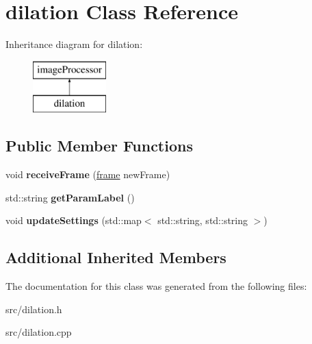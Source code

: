 \hypertarget{classdilation}{}\section{dilation Class Reference}
\label{classdilation}
Inheritance diagram for dilation\+:\begin{figure}[H]
\begin{center}
\leavevmode
\includegraphics[height=2.000000cm]{classdilation}
\end{center}
\end{figure}
\subsection*{Public Member Functions}
\begin{DoxyCompactItemize}
\item 
void {\bfseries receive\+Frame} (\hyperlink{classframe}{frame} new\+Frame)\hypertarget{classdilation_ad2edf7b45ead513737cce8ba2190ea38}{}\label{classdilation_ad2edf7b45ead513737cce8ba2190ea38}

\item 
std\+::string {\bfseries get\+Param\+Label} ()\hypertarget{classdilation_aac678c6a5fd8a4bcd6e5fd82a4ba9769}{}\label{classdilation_aac678c6a5fd8a4bcd6e5fd82a4ba9769}

\item 
void {\bfseries update\+Settings} (std\+::map$<$ std\+::string, std\+::string $>$)\hypertarget{classdilation_a0c243de870bb878a20c43673e082b953}{}\label{classdilation_a0c243de870bb878a20c43673e082b953}

\end{DoxyCompactItemize}
\subsection*{Additional Inherited Members}


The documentation for this class was generated from the following files\+:\begin{DoxyCompactItemize}
\item 
src/dilation.\+h\item 
src/dilation.\+cpp\end{DoxyCompactItemize}
